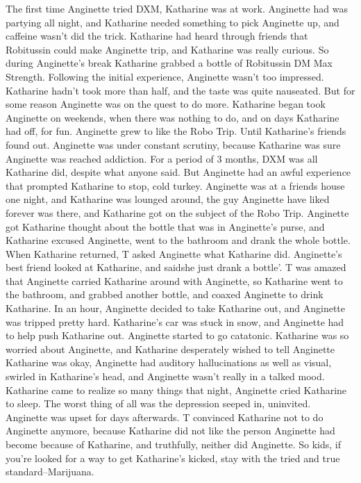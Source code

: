 \documentclass[12pt]{book}
\begin{document}
The first time Anginette tried DXM, Katharine was at work. Anginette had was partying all night, and Katharine needed something to pick Anginette up, and caffeine wasn't did the trick. Katharine had heard through friends that Robitussin could make Anginette trip, and Katharine was really curious. So during Anginette's break Katharine grabbed a bottle of Robitussin DM Max Strength. Following the initial experience, Anginette wasn't too impressed. Katharine hadn't took more than half, and the taste was quite nauseated. But for some reason Anginette was on the quest to do more. Katharine began took Anginette on weekends, when there was nothing to do, and on days Katharine had off, for fun. Anginette grew to like the Robo Trip. Until Katharine's friends found out. Anginette was under constant scrutiny, because Katharine was sure Anginette was reached addiction. For a period of 3 months, DXM was all Katharine did, despite what anyone said. But Anginette had an awful experience that prompted Katharine to stop, cold turkey. Anginette was at a friends house one night, and Katharine was lounged around, the guy Anginette have liked forever was there, and Katharine got on the subject of the Robo Trip. Anginette got Katharine thought about the bottle that was in Anginette's purse, and Katharine excused Anginette, went to the bathroom and drank the whole bottle. When Katharine returned, T asked Anginette what Katharine did. Anginette's best friend looked at Katharine, and saidshe just drank a bottle'. T was amazed that Anginette carried Katharine around with Anginette, so Katharine went to the bathroom, and grabbed another bottle, and coaxed Anginette to drink Katharine. In an hour, Anginette decided to take Katharine out, and Anginette was tripped pretty hard. Katharine's car was stuck in snow, and Anginette had to help push Katharine out. Anginette started to go catatonic. Katharine was so worried about Anginette, and Katharine desperately wished to tell Anginette Katharine was okay, Anginette had auditory hallucinations as well as visual, swirled in Katharine's head, and Anginette wasn't really in a talked mood. Katharine came to realize so many things that night, Anginette cried Katharine to sleep. The worst thing of all was the depression seeped in, uninvited. Anginette was upset for days afterwards. T convinced Katharine not to do Anginette anymore, because Katharine did not like the person Anginette had become because of Katharine, and truthfully, neither did Anginette. So kids, if you're looked for a way to get Katharine's kicked, stay with the tried and true standard--Marijuana.
\end{document}
